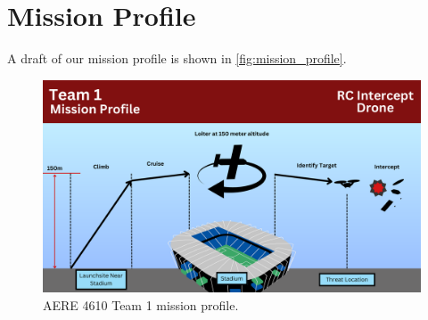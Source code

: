 \chapter{Mission Profile}\label{cp:mission_profile}

A draft of our mission profile is shown in \autoref{fig:mission_profile}.

\begin{figure}[htpb]
    \centering
    \includegraphics[width=\linewidth]{Figures/AERE 4610 Team 1 Mission Profile v1.0.0.pdf}
    \caption{AERE 4610 Team 1 mission profile.}
    \label{fig:mission_profile}
\end{figure}